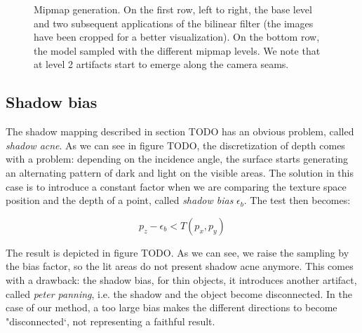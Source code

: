 \begin{figure}
{  \label{fig:jemip1}
} 
\caption{Mipmap generation. On the first row, left to right, the base level and two subsequent applications of the bilinear filter (the images have been cropped for a better visualization). On the bottom row, the model sampled with the different mipmap levels. We note that at level 2 artifacts start to emerge along the camera seams.}
\label{fig:mipmaps}
\end{figure}
\FloatBarrier

\subsection{Shadow bias}

The shadow mapping described in section TODO has an obvious problem, called \emph{shadow acne}. As we can see in figure TODO, the discretization of depth comes with a problem: depending on the incidence angle, the surface starts generating an alternating pattern of dark and light on the visible areas. The solution in this case is to introduce a constant factor when we are comparing the texture space position and the depth of a point, called \emph{shadow bias} $\epsilon_b$. The test then becomes:

$$
p_z - \epsilon_b < T(p_x,p_y)
$$ 

The result is depicted in figure TODO. As we can see, we raise the sampling by the bias factor, so the lit areas do not present shadow acne anymore. This comes with a drawback: the shadow bias, for thin objects, it introduces another artifact, called \emph{peter panning}, i.e. the shadow and the object become disconnected. In the case of our method, a too large bias makes the different directions to become "disconnected`, not representing a faithful result. 

